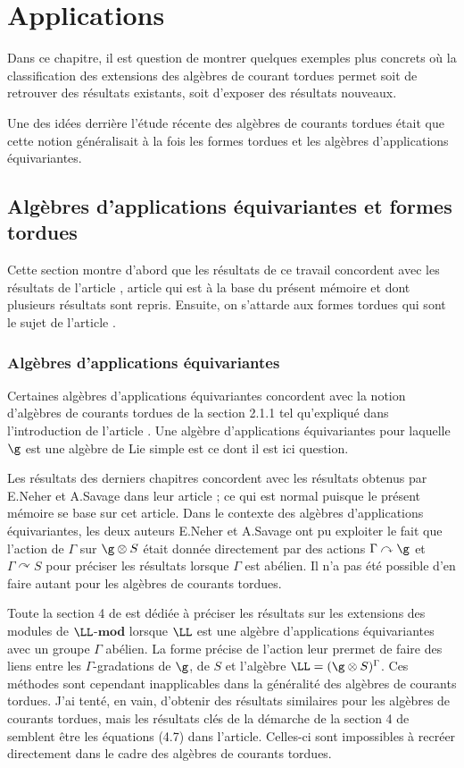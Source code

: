 \chapter{Applications}     %
Dans ce chapitre, il est question de montrer quelques exemples plus concrets où la classification des extensions des algèbres de courant tordues permet soit de retrouver des résultats existants, soit d'exposer des résultats nouveaux.

Une des idées derrière l'étude récente des algèbres de courants tordues était que cette notion généralisait à la fois les formes tordues et les algèbres d'applications équivariantes.

\section{Algèbres d'applications équivariantes et formes tordues}
Cette section montre d'abord que les résultats de ce travail concordent avec les résultats de l'article \cite{NSext}, article qui est à la base du présent mémoire et dont plusieurs résultats sont repris. Ensuite, on s'attarde aux formes tordues qui sont le sujet de l'article \cite{LPtfa}.
%
\subsection{Algèbres d'applications équivariantes}
Certaines algèbres d'applications équivariantes concordent avec la notion d'algèbres de courants tordues de la section 2.1.1 tel qu'expliqué dans l'introduction de l'article  \cite{LauTCA}. Une algèbre d'applications équivariantes pour laquelle $\g$ est une algèbre de Lie simple est ce dont il est ici question.

Les résultats des derniers chapitres concordent avec les résultats obtenus par E.Neher et A.Savage dans leur article \cite{NSext} ; ce qui est normal puisque le présent mémoire se base sur cet article. Dans le contexte des algèbres d'applications équivariantes, les deux auteurs E.Neher et A.Savage ont pu exploiter le fait que l'action de $\Gamma$ sur $\g \otimes S$ était donnée directement par des actions $\Gamma \curvearrowright \g$ et $\Gamma \curvearrowright S$ pour préciser les résultats lorsque $\Gamma$ est abélien. Il n'a pas été possible d'en faire autant pour les algèbres de courants tordues.

Toute la section 4 de \cite{NSext} est dédiée à préciser les résultats sur les extensions des modules de $\LL$-$\mathbf{mod}$ lorsque $\LL$ est une algèbre d'applications équivariantes avec un groupe $\Gamma$ abélien. La forme précise de l'action leur prermet de faire des liens entre les $\Gamma$-gradations de $\g$, de $S$ et l'algèbre $\LL = (\g \otimes S)^\Gamma$. Ces méthodes sont cependant inapplicables dans la généralité des algèbres de courants tordues. J'ai tenté, en vain, d'obtenir des résultats similaires pour les algèbres de courants tordues, mais les résultats clés de la démarche de la section 4 de \cite{NSext} semblent être les équations (4.7) dans l'article. Celles-ci sont impossibles à recréer directement dans le cadre des algèbres de courants tordues. 

